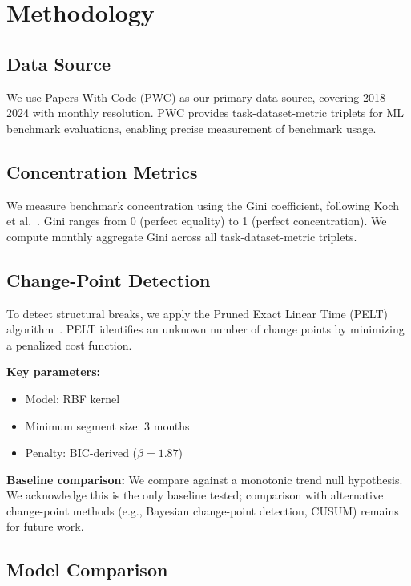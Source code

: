 \section{Methodology}

\subsection{Data Source}

We use Papers With Code (PWC) as our primary data source, covering 2018--2024 with monthly resolution. PWC provides task-dataset-metric triplets for ML benchmark evaluations, enabling precise measurement of benchmark usage.

\subsection{Concentration Metrics}

We measure benchmark concentration using the Gini coefficient, following Koch et al.~\cite{koch2021reduced}. Gini ranges from 0 (perfect equality) to 1 (perfect concentration). We compute monthly aggregate Gini across all task-dataset-metric triplets.

\subsection{Change-Point Detection}

To detect structural breaks, we apply the Pruned Exact Linear Time (PELT) algorithm~\cite{killick2012optimal}. PELT identifies an unknown number of change points by minimizing a penalized cost function.

\textbf{Key parameters:}
\begin{itemize}
    \item Model: RBF kernel
    \item Minimum segment size: 3 months
    \item Penalty: BIC-derived ($\beta = 1.87$)
\end{itemize}

\textbf{Baseline comparison:} We compare against a monotonic trend null hypothesis. We acknowledge this is the only baseline tested; comparison with alternative change-point methods (e.g., Bayesian change-point detection, CUSUM) remains for future work.

\subsection{Model Comparison}

